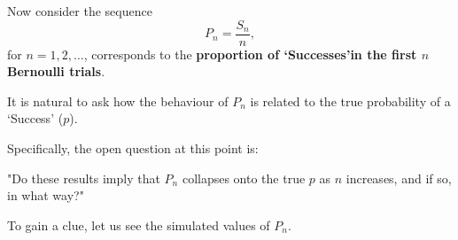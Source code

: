 \documentclass[notes=show,smaller,handout]{beamer}\usepackage[]{graphicx}\usepackage[]{color}
\newenvironment{stepitemize}{\begin{itemize}[<+->]}{\end{itemize} }
\begin{document}
\begin{frame}{\secname}

  \begin{example}
    \begin{footnotesize}
    Now consider the sequence
    $${P}_n=\frac{S_n}{n},$$
    for $n=1,2,\ldots$, corresponds to the \textbf{proportion of `Successes'in the first $n$ Bernoulli trials}.
    \bigskip


    It is natural to ask how the behaviour of  ${P}_n$ is related to the true probability of a `Success' ($p$).
    \bigskip


    Specifically, the open question at this point is: \\
    \medskip
    \begin{center}
    \color{red} "Do these results imply that ${P}_n$ collapses onto the true $p$ as $n$ increases, and if
    so, in what way?"  \color{black} \\ \medskip
    \end{center}
    To gain a clue, let us see the simulated values of ${P}_n$.

    \end{footnotesize}
    \end{example}
\end{frame}%
\end{document}
